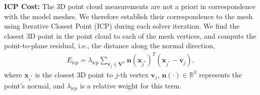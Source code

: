 \textbf{ICP Cost:} The 3D point cloud measurements are not a priori in correspondence with the model meshes. We therefore establish their correspondence to the mesh using Iterative Closest Point (ICP) during each solver iteration. 
We find the closest 3D point in the point cloud to each of the mesh vertices, and compute the point-to-plane residual, i.e., the distance along the normal direction,
\begin{align}
E_\textrm{icp} = \lambda_\textrm{icp} \sum_{\mathbf{v}_j \in \mathbf{V}^U} \mathbf{n}(\mathbf{x}_{j^*})^T (\mathbf{x}_{j^*} - \mathbf{v}_j ),
\end{align}
where $\mathbf{x}_{i^*}$ is the closest 3D point to $j$-th vertex $\mathbf{v}_j$,  $\mathbf{n}(\cdot)\in\mathds{R}^3$ represents the point's normal, and $\lambda_\textrm{icp}$ is a relative weight for this term. 

%
%

